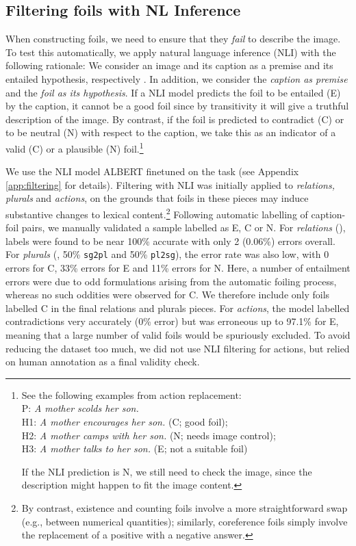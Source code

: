 \documentclass[11pt]{article}
\begin{document}
\subsection{Filtering foils with NL Inference} \label{subsec:nli}
When constructing foils, we need to ensure that they \textit{fail} to describe the image. To test this automatically, we apply natural language inference (NLI) with the following rationale: We consider an image and its caption as a premise and its entailed hypothesis, respectively \citep[a similar rationale is applied in the visual entailment task;][]{Xie2019}. In addition, we consider the \textit{caption as premise} and the \textit{foil as its hypothesis}. 
If a NLI model predicts the foil to be entailed (E) by the caption, it cannot be a good foil since by transitivity it will give a truthful description of the image. 
By contrast, if the foil is predicted to contradict (C) or to be neutral (N) with respect to the caption, we take this as an indicator of a valid
(C) or a plausible (N) foil.\footnote{See the following examples from action replacement:\\
P: \textit{A mother scolds her son.} \\
H1: \textit{A mother encourages her son.} (C; good foil);\\
H2: \textit{A mother camps with her son.} (N; needs image control);\\
H3: \textit{A mother talks to her son.} (E; not a suitable foil)


If the NLI prediction is N,  we still need to check the image, since the description might happen to fit the image content.} 

We use the NLI model ALBERT \cite{lan2019albert} finetuned on the task (see Appendix \ref{app:filtering} for details).
Filtering with NLI was initially applied to \textit{relations, plurals} and \textit{actions}, on the grounds that foils in these pieces 
may induce
substantive changes to lexical content.\footnote{By contrast, existence and counting foils involve a more straightforward swap (e.g., between numerical quantities); similarly, coreference foils simply involve the replacement of a positive with a negative answer.} Following automatic labelling of caption-foil pairs, we manually validated a sample 
labelled as E, C or N. For \textit{relations} (), labels were found to be near 100\% accurate with only 2 (0.06\%) errors overall. For \textit{plurals} (, 50\% {\tt sg2pl} and 50\% {\tt pl2sg}), the error rate was also low, with 0 errors for C, 33\% errors for E and 11\% errors for N. Here,
a number of entailment errors were due to odd formulations arising from the automatic foiling process, whereas no such oddities were observed for C. We therefore include only foils labelled C in the final relations and plurals pieces. For \textit{actions}, the model labelled contradictions very accurately (0\% error) but was erroneous up to 97.1\% for E, meaning that a large number of valid foils would be spuriously excluded. To avoid reducing the dataset too much, we did not use NLI filtering for actions, but relied on human annotation as a final validity check.
\end{document}
